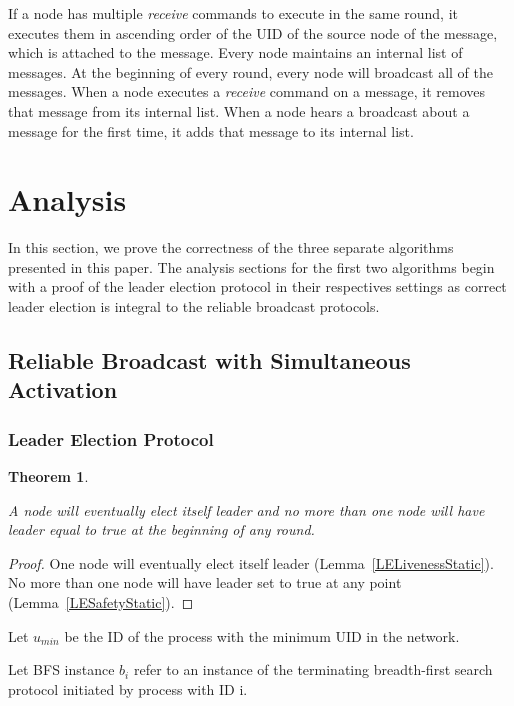 \documentclass[english]{article}
\newtheorem{theorem}{Theorem}[section]
\begin{document}
If a node has multiple \textit{receive} commands to execute in the same round, it executes them in ascending order of the UID of the source node of the message, which is attached to the message. Every node maintains an internal list of messages. At the beginning of every round, every node will broadcast all of the messages. When a node executes a \textit{receive} command on a message, it removes that message from its internal list.  When a node hears a broadcast about a message for the first time, it adds that message to its internal list.


\section{Analysis}

In this section, we prove the correctness of the three separate algorithms presented in this paper. The analysis sections for the first two algorithms begin with a proof of the leader election protocol in their respectives settings as correct leader election is integral to the reliable broadcast protocols.

\subsection {Reliable Broadcast with Simultaneous Activation}

\subsubsection{Leader Election Protocol}

\begin{theorem}
\label{LeaderElectionStatic}

A node will eventually elect itself leader and no more than one node will have leader equal to true at the beginning of any round. 
\end{theorem}
\begin{proof}
One node will eventually elect itself leader (Lemma~\ref{LELivenessStatic}).
No more than one node will have leader set to true at any point (Lemma~\ref{LESafetyStatic}).
\end{proof}

\begin{definition}
Let $u_{min}$ be the ID of the process with the minimum UID in the network. 
\end{definition}

\begin{definition}
Let BFS instance $b_i$ refer to an instance of the terminating breadth-first search protocol initiated by process with ID i.
\end{definition}
\end{document}

